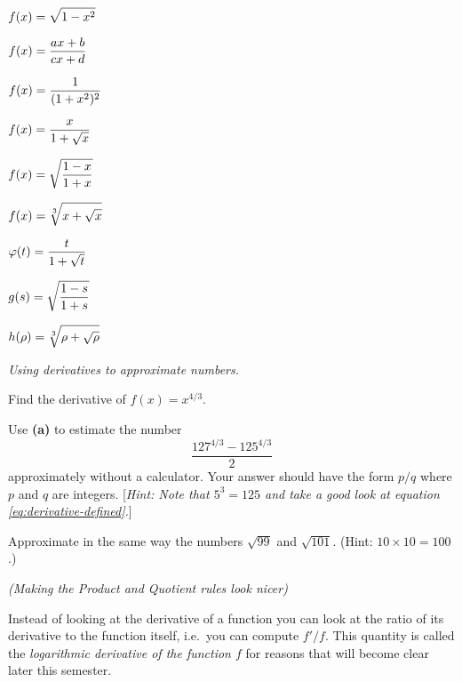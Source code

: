 \begin{multicols}{2}
\problem $\displaystyle f(x) = \sqrt{1-x^2}$ 




\problem $\displaystyle f(x) = \frac{ax+b}{cx+d}$ 




\problem $\displaystyle f(x) = \frac1{(1+x^2)^2}$ 




\problem $\displaystyle f(x) = \frac{x}{1+\sqrt x}$ 




\problem $\displaystyle f(x) = \sqrt{\frac{1-x}{1+x}}$ 




\problem $\displaystyle f(x) = \sqrt[3]{x+\sqrt x}$ 




\problem $\displaystyle \varphi(t) = \frac{t}{1+\sqrt t} $ 




\problem $\displaystyle g(s) = \sqrt{\frac{1-s}{1+s}} $ 




\problem $\displaystyle h(\rho) = \sqrt[3]{\rho+\sqrt \rho}$ 












\problem \groupproblem\textit{Using derivatives to approximate numbers. } 




\subprob Find the derivative of $f(x) = x^{4/3}$.




\subprob Use \textbf{(a)} to estimate the number
\[
\frac{127^{4/3}-125^{4/3}}{2}
\]
approximately without a calculator. Your answer should have the form
$p/q$ where $p$ and $q$ are integers.  [\textsl{Hint: Note that
$5^3=125$ and take
a good look at equation \eqref{eq:derivative-defined}.}]




\subprob Approximate in the same way the numbers $\sqrt{99}$ and
$\sqrt{101}$. (Hint: $10\times 10=100$.)








\problem\label{ex:05log-derivs} 
\textit{(Making the Product and Quotient rules look nicer)}




Instead of looking at the derivative of a function you
can look at the ratio of its derivative to the function itself, i.e.\
you can compute $f'/f$.  This quantity is called the
\emph{logarithmic derivative of the function $f$} for reasons that
will become clear later this semester.



\end{multicols}
